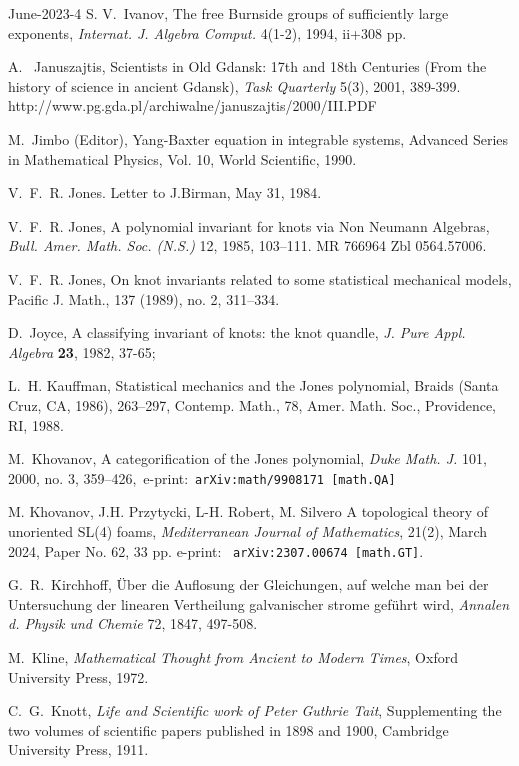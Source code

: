 \documentclass[12pt]{amsart}
\begin{document}
\begin{thebibliography}{June-2023-4}
 S. V.~Ivanov, The free Burnside groups of sufficiently
large exponents, {\it Internat. J. Algebra Comput.} 4(1-2), 1994, ii+308 pp.

A.~ Januszajtis, Scientists in Old Gdansk: 17th and 18th Centuries
(From the history of science in ancient Gdansk), {\it Task Quarterly} 5(3),
2001, 389-399.\\
http://www.pg.gda.pl/archiwalne/januszajtis/2000/III.PDF

M.~Jimbo (Editor), Yang-Baxter equation in integrable systems, Advanced Series in Mathematical Physics, Vol. 10,
World Scientific, 1990.

V.~F.~R. Jones. Letter to J.Birman, May 31, 1984.

 V.~F.~R. Jones,
A polynomial invariant for knots via Non Neumann Algebras, {\it Bull. Amer. Math. Soc. (N.S.)} 12, 1985, 103–111. MR 766964 Zbl 0564.57006.

V.~F.~R. Jones, On knot invariants related to some statistical mechanical models, Pacific J. Math., 137 (1989), no. 2, 311–334.

 D.~Joyce, A classifying invariant of knots: the knot
quandle, {\it J. Pure Appl. Algebra} \textbf{23}, 1982, 37-65;

 L.~H. Kauffman,
Statistical mechanics and the Jones polynomial, Braids
(Santa Cruz, CA, 1986),
263--297, Contemp. Math., 78, Amer. Math. Soc., Providence, RI, 1988.

M.~Khovanov,
A categorification of the Jones polynomial,
{\it Duke Math. J.} 101, 2000, no. 3, 359--426,\
e-print:\ {\tt arXiv:math/9908171 [math.QA]}

 M. Khovanov, J.H. Przytycki, L-H. Robert, M. Silvero
A topological theory of unoriented SL(4) foams, 
{\it Mediterranean Journal of Mathematics}, 21(2), March 2024, Paper No. 62, 33 pp.
e-print: \ {\tt arXiv:2307.00674 [math.GT]}.

G.~R.~Kirchhoff, \"{U}ber die Auflosung der Gleichungen, auf welche
man bei der Untersuchung der linearen Vertheilung galvanischer
strome gef\"{u}hrt wird, {\it Annalen d. Physik und Chemie} 72,
1847, 497-508.

M.~Kline,  {\it  Mathematical Thought from Ancient to Modern Times},
Oxford University Press, 1972.

C.~G.~Knott, {\it Life and Scientific work of Peter Guthrie
Tait}, Supplementing the two volumes of scientific papers published
in 1898 and 1900, Cambridge University Press, 1911.


\end{thebibliography}
\end{document}
